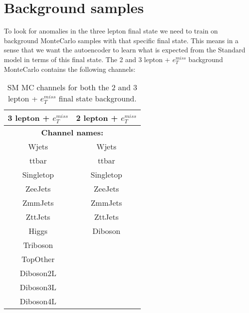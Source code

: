 \section{Background samples}

To look for anomalies in the three lepton final state we need to train on background MonteCarlo samples with that specific final state. 
This means in a sense that we want the autoencoder to learn what is expected from the Standard model in terms of this final state. 
The 2 and 3 lepton + $e_T^{miss}$ background MonteCarlo contains the following channels:

\begin{table}[H]
    \centering
    \caption[SM MC channels]{SM MC channels for both the 2 and 3 lepton + $e_T^{miss}$ final state background. }
    \label{tab:bkg_channels}
    \begin{tabular}{|cc|}
    \hline
    \multicolumn{1}{|c|}{\textbf{3 lepton + $e_T^{miss}$}} & \textbf{2 lepton + $e_T^{miss}$} \\ \hline
    \multicolumn{2}{|c|}{\textbf{Channel names:}}                                             \\ \hline
    \multicolumn{1}{|c|}{Wjets}                            & Wjets                            \\ \hline
    \multicolumn{1}{|c|}{ttbar}                            & ttbar                            \\ \hline
    \multicolumn{1}{|c|}{Singletop}                        & Singletop                        \\ \hline
    \multicolumn{1}{|c|}{ZeeJets}                          & ZeeJets                          \\ \hline
    \multicolumn{1}{|c|}{ZmmJets}                          & ZmmJets                          \\ \hline
    \multicolumn{1}{|c|}{ZttJets}                          & ZttJets                          \\ \hline
    \multicolumn{1}{|c|}{Higgs}                            & Diboson                          \\ \hline
    \multicolumn{1}{|c|}{Triboson}                         &                                  \\ \hline
    \multicolumn{1}{|c|}{TopOther}                         &                                  \\ \hline
    \multicolumn{1}{|c|}{Diboson2L}                        &                                  \\ \hline
    \multicolumn{1}{|c|}{Diboson3L}                        &                                  \\ \hline
    \multicolumn{1}{|c|}{Diboson4L}                        &                                  \\ \hline
\end{tabular}
\end{table}


